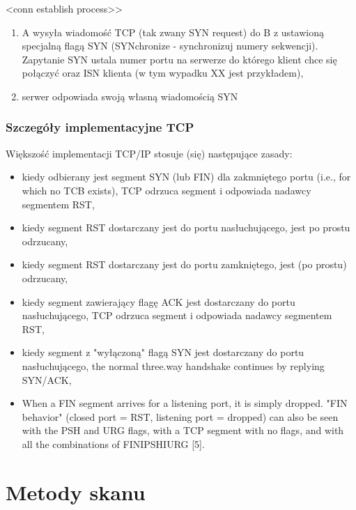 <conn establish process>>

\begin{enumerate}
\item A wysyła wiadomość TCP (tak zwany SYN request) do B z ustawioną specjalną flagą SYN (SYNchronize - synchronizuj numery sekwencji). Zapytanie SYN ustala numer portu na serwerze do którego klient chce się połączyć oraz ISN klienta (w tym wypadku XX jest przykładem),
\item serwer odpowiada swoją własną wiadomością SYN 
\end{enumerate}


\subsubsection{Szczegóły implementacyjne TCP}

Większość implementacji TCP/IP stosuje (się) następujące zasady:
\begin{itemize}
\item kiedy odbierany jest segment SYN (lub FIN) dla zakmniętego portu (i.e., for which no TCB exists), TCP odrzuca segment i odpowiada nadawcy segmentem RST,
\item kiedy segment RST dostarczany jest do portu nasłuchującego, jest po prostu odrzucany,
\item kiedy segment RST dostarczany jest do portu zamkniętego, jest (po prostu) odrzucany,
\item kiedy segment zawierający flagę ACK jest dostarczany do portu nasłuchującego, TCP odrzuca segment i odpowiada nadawcy segmentem RST,
\item kiedy segment z "wyłączoną" flagą SYN jest dostarczany do portu nasłuchującego, the normal three.way handshake continues by replying SYN/ACK,
\item When a FIN segment arrives for a listening port, it is simply dropped. "FIN behavior" (closed port = RST, listening port = dropped) can also be seen with the PSH and URG flags, with a TCP segment with no flags, and with all the combinations of FINIPSHIURG [5].
\end{itemize}






\section{Metody skanu}

